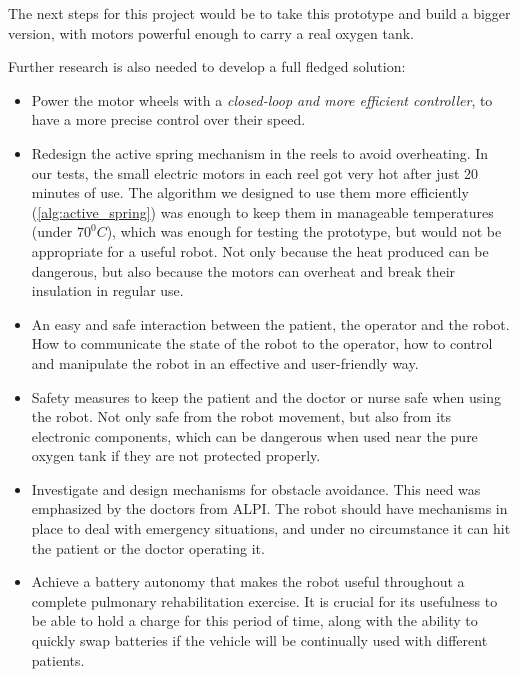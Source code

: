 \documentclass[journal]{IEEEtran}
\begin{document}
The next steps for this project would be to take this prototype and build a bigger version, with motors powerful enough to carry a real oxygen tank. 

Further research is also needed to develop a full fledged solution: 
\begin{itemize}
    \item Power the motor wheels with a \textit{closed-loop and more efficient controller}, to have a more precise control over their speed.
    \item Redesign the active spring mechanism in the reels to avoid overheating. In our tests, the small electric motors in each reel got very hot after just 20 minutes of use. The algorithm we designed to use them more efficiently (\ref{alg:active_spring}) was enough to keep them in manageable temperatures (under $70^0C$), which was enough for testing the prototype, but would not be appropriate for a useful robot. Not only because the heat produced can be dangerous, but also because the motors can overheat and break their insulation in regular use.
    \item An easy and safe interaction between the patient, the operator and the robot. How to communicate the state of the robot to the operator, how to control and manipulate the robot in an effective and user-friendly way.
    \item Safety measures to keep the patient and the doctor or nurse safe when using the robot. Not only safe from the robot movement, but also from its electronic components, which can be dangerous when used near the pure oxygen tank if they are not protected properly.
    \item Investigate and design mechanisms for obstacle avoidance. This need was emphasized by the doctors from ALPI. The robot should have mechanisms in place to deal with emergency situations, and under no circumstance it can hit the patient or the doctor operating it.
    \item Achieve a battery autonomy that makes the robot useful throughout a complete pulmonary rehabilitation exercise. It is crucial for its usefulness to be able to hold a charge for this period of time, along with the ability to quickly swap batteries if the vehicle will be continually used with different patients.
\end{itemize}{}




\end{document}
